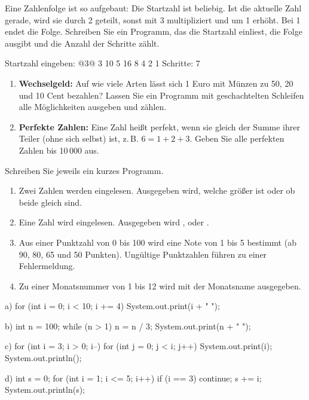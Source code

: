 Eine Zahlenfolge ist so aufgebaut: Die Startzahl ist beliebig. Ist die aktuelle Zahl gerade, wird sie durch 2 geteilt, sonst mit 3 multipliziert und um 1 erhöht. Bei 1 endet die Folge. Schreiben Sie ein Programm, das die Startzahl einliest, die Folge ausgibt und die Anzahl der Schritte zählt.
\begin{konsole}
Startzahl eingeben:
@3@
3 10 5 16 8 4 2 1
Schritte: 7
\end{konsole}

\begin{enumerate}[label=\alph*)]
\item \textbf{Wechselgeld:} Auf wie viele Arten lässt sich 1 Euro mit Münzen zu 50, 20 und 10 Cent bezahlen? Lassen Sie ein Programm mit geschachtelten Schleifen alle Möglichkeiten ausgeben und zählen.
\item \textbf{Perfekte Zahlen:} Eine Zahl heißt perfekt, wenn sie gleich der Summe ihrer Teiler (ohne sich selbst) ist, z.\,B. $6 = 1 + 2 + 3$. Geben Sie alle perfekten Zahlen bis 10\,000 aus.
\end{enumerate}

\ueben
{}
Schreiben Sie jeweils ein kurzes Programm.
\begin{enumerate}[label=\alph*)]
\item Zwei Zahlen werden eingelesen. Ausgegeben wird, welche größer ist oder ob beide gleich sind.
\item Eine Zahl wird eingelesen. Ausgegeben wird ,  oder .
\item Aus einer Punktzahl von 0 bis 100 wird eine Note von 1 bis 5 bestimmt (ab 90, 80, 65 und 50 Punkten). Ungültige Punktzahlen führen zu einer Fehlermeldung.
\item Zu einer Monatsnummer von 1 bis 12 wird mit  der Monatsname ausgegeben.
\end{enumerate}

\begin{tcbraster}[raster columns=2, raster equal height=rows, raster column skip=3mm, raster row skip=1mm]
\begin{javacode}[Ausschnitt]{a)}
for (int i = 0; i < 10; i += 4) {
	System.out.print(i + " ");
}
\end{javacode}
\begin{javacode}[Ausschnitt]{b)}
int n = 100;
while (n > 1) {
	n = n / 3;
	System.out.print(n + " ");
}
\end{javacode}
\begin{javacode}[Ausschnitt]{c)}
for (int i = 3; i > 0; i--) {
	for (int j = 0; j < i; j++) {
		System.out.print(i);
	}
	System.out.println();
}
\end{javacode}
\begin{javacode}[Ausschnitt]{d)}
int s = 0;
for (int i = 1; i <= 5; i++) {
	if (i == 3) continue;
	s += i;
}
System.out.println(s);
\end{javacode}
\end{tcbraster}

